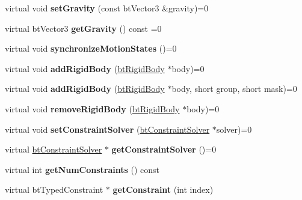 \begin{DoxyCompactItemize}
virtual void {\bfseries set\+Gravity} (const bt\+Vector3 \&gravity)=0
\item 
\mbox{\label{classbtDynamicsWorld_a2a1de7e4e5456428d4558be6f24723ef}} 
virtual bt\+Vector3 {\bfseries get\+Gravity} () const =0
\item 
\mbox{\label{classbtDynamicsWorld_aed92a7b6bc477b60d50988a048eaa5a6}} 
virtual void {\bfseries synchronize\+Motion\+States} ()=0
\item 
\mbox{\label{classbtDynamicsWorld_a8d8f03c04ba63f525e09cb95452687f0}} 
virtual void {\bfseries add\+Rigid\+Body} (\hyperlink{classbtRigidBody}{bt\+Rigid\+Body} $\ast$body)=0
\item 
\mbox{\label{classbtDynamicsWorld_ac516f56dd52fc5d5575bb863ead1ad04}} 
virtual void {\bfseries add\+Rigid\+Body} (\hyperlink{classbtRigidBody}{bt\+Rigid\+Body} $\ast$body, short group, short mask)=0
\item 
\mbox{\label{classbtDynamicsWorld_a06ac55453d839d0a6cbc9c53e5537f73}} 
virtual void {\bfseries remove\+Rigid\+Body} (\hyperlink{classbtRigidBody}{bt\+Rigid\+Body} $\ast$body)=0
\item 
\mbox{\label{classbtDynamicsWorld_a65cd45eeb235a87516f4f22383ceac49}} 
virtual void {\bfseries set\+Constraint\+Solver} (\hyperlink{classbtConstraintSolver}{bt\+Constraint\+Solver} $\ast$solver)=0
\item 
\mbox{\label{classbtDynamicsWorld_af6179dea87b148971a2fed3c14ff052b}} 
virtual \hyperlink{classbtConstraintSolver}{bt\+Constraint\+Solver} $\ast$ {\bfseries get\+Constraint\+Solver} ()=0
\item 
\mbox{\label{classbtDynamicsWorld_a6578dac0bc85b792df55ebebd9feae61}} 
virtual int {\bfseries get\+Num\+Constraints} () const
\item 
\mbox{\label{classbtDynamicsWorld_a25547b26ffbe6659c34c7e021bc2e532}} 
virtual bt\+Typed\+Constraint $\ast$ {\bfseries get\+Constraint} (int index)
\item 

\end{DoxyCompactItemize}
